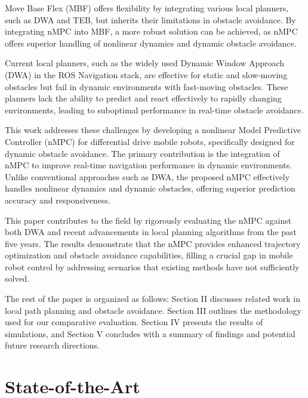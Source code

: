 \documentclass[conference]{IEEEtran}
\begin{document}
Move Base Flex (MBF) offers flexibility by integrating various local planners, such as DWA and TEB, but inherits their limitations in obstacle avoidance. By integrating nMPC into MBF, a more robust solution can be achieved, as nMPC offers superior handling of nonlinear dynamics and dynamic obstacle avoidance.

Current local planners, such as the widely used Dynamic Window Approach (DWA) in the ROS Navigation stack, are effective for static and slow-moving obstacles but fail in dynamic environments with fast-moving obstacles. These planners lack the ability to predict and react effectively to rapidly changing environments, leading to suboptimal performance in real-time obstacle avoidance.

This work addresses these challenges by developing a nonlinear Model Predictive Controller (nMPC) for differential drive mobile robots, specifically designed for dynamic obstacle avoidance. The primary contribution is the integration of nMPC to improve real-time navigation performance in dynamic environments. Unlike conventional approaches such as DWA, the proposed nMPC effectively handles nonlinear dynamics and dynamic obstacles, offering superior prediction accuracy and responsiveness.

This paper contributes to the field by rigorously evaluating the nMPC against both DWA and recent advancements in local planning algorithms from the past five years. The results demonstrate that the nMPC provides enhanced trajectory optimization and obstacle avoidance capabilities, filling a crucial gap in mobile robot control by addressing scenarios that existing methods have not sufficiently solved.

The rest of the paper is organized as follows: Section II discusses related work in local path planning and obstacle avoidance. Section III outlines the methodology used for our comparative evaluation. Section IV presents the results of simulations, and Section V concludes with a summary of findings and potential future research directions.


\section{State-of-the-Art}
\end{document}
